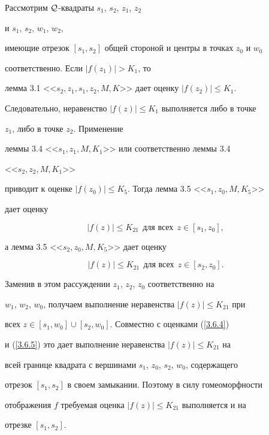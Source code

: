 \begin{pf}


Рассмотрим ${\cal Q}$-квадраты $s_1$, $s_2$, $z_1$, $z_2$


и $s_1$, $s_2$, $w_1$, $w_2$, 


имеющие отрезок $[s_1, s_2]$ общей стороной и центры в точках $z_0$ и $w_0$ 


соответственно. Если $|f(z_1)|> K_1$, то 


лемма 3.1 <<$s_2, z_1, s_1, z_2, M, K$>> дает оценку $|f(z_2)|\leq K_1$. 


Следовательно, неравенство $|f(z)| \leq K_1$ выполняется либо в точке 


$z_1$, либо в точке $z_2$. Применение 


леммы 3.4 <<$s_1, z_1, M, K_1$>> или соответственно леммы 3.4 


<<$s_2, z_2, M, K_1$>> 


приводит к оценке $|f(z_0)| \leq K_5$. Тогда лемма 3.5 <<$s_1, z_0, M, K_5$>> 


дает оценку


\begin{equation} 


\label{3.6.4} 


|f(z)| \leq K_{21} \ \ \text{для всех} \ \ z\in [s_1, z_0], 


\end{equation}


а лемма 3.5 <<$s_2, z_0, M, K_5$>> дает оценку


\begin{equation}


\label{3.6.5}


|f(z)| \leq K_{21} \ \ \text{для всех} \ \ z\in [s_2, z_0].


\end{equation}


Заменив в этом рассуждении $z_1$, $z_2$, $z_0$ соответственно на 


$w_1$, $w_2$, $w_0$, получаем выполнение неравенства $|f(z)| \leq K_{21}$ при 


всех $z\in [s_1, w_0] \cup [s_2, w_0]$. Совместно с оценками (\ref{3.6.4}) 


и (\ref{3.6.5}) это дает выполнение неравенства $|f(z)|\leq K_{21}$ на 


всей границе квадрата с вершинами $s_1$, $z_0$, $s_2$, $w_0$, содержащего 


отрезок $[s_1, s_2]$ в своем замыкании. Поэтому в силу гомеоморфности 


отображения $f$ требуемая оценка $|f(z)|\leq K_{21}$ выполняется и на 


отрезке $[s_1, s_2]$.


\end{pf}





